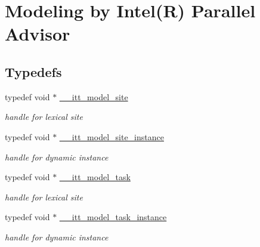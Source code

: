 \hypertarget{group__model}{}\section{Modeling by Intel(R) Parallel Advisor}
\label{group__model}
\subsection*{Typedefs}
\begin{DoxyCompactItemize}
\item 
\hypertarget{group__model_ga920087b18ed59a70239461b5295cc26e}{}typedef void $\ast$ \hyperlink{group__model_ga920087b18ed59a70239461b5295cc26e}{\+\_\+\+\_\+itt\+\_\+model\+\_\+site}\label{group__model_ga920087b18ed59a70239461b5295cc26e}

\begin{DoxyCompactList}\small\item\em handle for lexical site \end{DoxyCompactList}\item 
\hypertarget{group__model_gaa037f000a165fb7fc2c73b97b31491f1}{}typedef void $\ast$ \hyperlink{group__model_gaa037f000a165fb7fc2c73b97b31491f1}{\+\_\+\+\_\+itt\+\_\+model\+\_\+site\+\_\+instance}\label{group__model_gaa037f000a165fb7fc2c73b97b31491f1}

\begin{DoxyCompactList}\small\item\em handle for dynamic instance \end{DoxyCompactList}\item 
\hypertarget{group__model_ga96b1dc87978dfc08d2f7740f9d3d2196}{}typedef void $\ast$ \hyperlink{group__model_ga96b1dc87978dfc08d2f7740f9d3d2196}{\+\_\+\+\_\+itt\+\_\+model\+\_\+task}\label{group__model_ga96b1dc87978dfc08d2f7740f9d3d2196}

\begin{DoxyCompactList}\small\item\em handle for lexical site \end{DoxyCompactList}\item 
\hypertarget{group__model_ga649e02ad732b5bfc895a239353d09588}{}typedef void $\ast$ \hyperlink{group__model_ga649e02ad732b5bfc895a239353d09588}{\+\_\+\+\_\+itt\+\_\+model\+\_\+task\+\_\+instance}\label{group__model_ga649e02ad732b5bfc895a239353d09588}

\begin{DoxyCompactList}\small\item\em handle for dynamic instance \end{DoxyCompactList}\end{DoxyCompactItemize}
